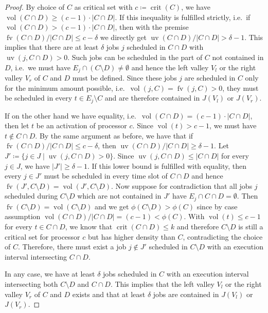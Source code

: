 \documentclass[a4paper]{article}
\DeclareMathOperator{\fv}{fv}
\DeclareMathOperator{\uv}{uv}
\DeclareMathOperator{\vol}{vol}
\DeclareMathOperator{\crit}{crit}
\begin{document}
\begin{proof}
  By choice of $C$ as critical set with $c \coloneqq \crit(C)$, we have $\vol(C \cap D) \geq (c-1) \cdot |C \cap D|$.
  If this inequality is fulfilled strictly, i.e.\ if
  $\vol(C \cap D) > (c-1) \cdot |C \cap D|$, then with the premise
  $\fv(C \cap D) / |C \cap D| \leq c - \delta$ we directly get $\uv(C \cap D) / |C \cap D| > \delta - 1$.
  This implies that there are at least $\delta$ jobs $j$ scheduled in $C \cap D$ with $\uv(j, C \cap D) > 0$.
  Such jobs can be scheduled in the part of $C$ not contained in $D$, i.e.\ we must have $E_j \cap (C \setminus D) \neq \emptyset$ and hence the left valley $V_l$ or the right valley $V_r$ of $C$ and $D$ must be defined.
  Since these jobs $j$ are scheduled in $C$ only for the minimum amount possible, i.e.\ $\vol(j, C) = \fv(j, C) > 0$, they must be scheduled in every $t \in E_j \setminus C$ and are therefore contained in $J(V_l)$ or $J(V_r)$.

  If on the other hand we have equality, i.e.\ $\vol(C \cap D) = (c-1) \cdot |C \cap D|$, then let $t$ be an activation of processor $c$.
  Since $\vol(t) > c-1$, we must have $t \notin C \cap D$.
  By the same argument as before, we have that if $\fv(C \cap D) / |C \cap D| \leq c - \delta$, then $\uv(C \cap D) / |C \cap D| \geq \delta - 1$.
  Let $J' \coloneqq \{ j \in J \mid \uv(j, C \cap D) > 0 \}$.
  Since $\uv(j, C \cap D) \leq | C \cap D |$ for every $j \in J$, we have $|J'| \geq \delta - 1$.
  If this lower bound is fulfilled with equality, then every $j \in J'$ must be scheduled in every time slot of $C \cap D$ and hence $\fv(J', C \setminus D) = \vol(J', C \setminus D)$.
  Now suppose for contradiction that all jobs $j$ scheduled during $C \setminus D$ which are not contained in $J'$ have $E_j \cap C \cap D = \emptyset$.
  Then $\fv(C \setminus D) = \vol(C \setminus D)$ and
  we get $\phi(C \setminus D) > \phi(C)$ since by case assumption $\vol(C \cap D) / |C \cap D| = (c-1) < \phi(C)$.
  With $\vol(t) \leq c - 1$ for every $t \in C \cap D$, we know that $\crit(C \cap D) \leq k$ and therefore $C \setminus D$ is still a critical set for processor $c$ but has higher density than $C$, contradicting the choice of $C$.
  Therefore, there must exist a job $j \notin J'$ scheduled in $C \setminus D$ with an execution interval intersecting $C \cap D$.

  In any case, we have at least $\delta$ jobs scheduled in $C$ with an execution interval intersecting both $C \setminus D$ and $C \cap D$.
  This implies that the left valley $V_l$ or the right valley $V_r$ of $C$ and $D$ exists and that at least $\delta$ jobs are contained in $J(V_l)$ or $J(V_r)$.
\end{proof}
\end{document}
